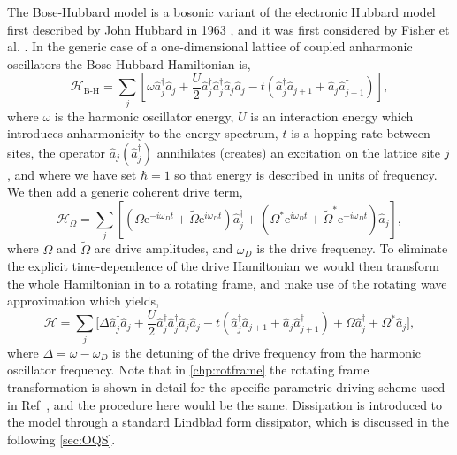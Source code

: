The Bose-Hubbard model is a bosonic variant of the electronic Hubbard model first described by John Hubbard in 1963 \cite{Hubbard1963}, and it was first considered by Fisher et al. \cite{Fisher1989}. In the generic case of a one-dimensional lattice of coupled anharmonic oscillators the Bose-Hubbard Hamiltonian is,
\begin{equation}
	\mathcal{H}_{\text{B-H}} = \sum_{j} \left[ \omega\hat{a}_{j}^{\dagger}\hat{a}_{j} + \frac{U}{2}\hat{a}_{j}^{\dagger}\hat{a}_{j}^{\dagger}\hat{a}_{j}\hat{a}_{j} - t\left(\hat{a}_{j}^{\dagger}\hat{a}_{j+1} + \hat{a}_{j}\hat{a}_{j+1}^{\dagger}\right) \right],
	\label{eq:mbq2-1}
\end{equation}
where \(\omega\) is the harmonic oscillator energy, \(U\) is an interaction energy which introduces anharmonicity to the energy spectrum, \(t\) is a hopping rate between sites, the operator \(\hat{a}_{j} (\hat{a}_{j}^{\dagger})\) annihilates (creates) an excitation on the lattice site \(j\), and where we have set \(\hbar = 1\) so that energy is described in units of frequency. We then add a generic coherent drive term,
\begin{equation}
	\mathcal{H}_{\Omega} = \sum_{j} \left[ \left(\Omega\mathrm{e}^{-i\omega_{D}t} + \tilde{\Omega}\mathrm{e}^{i\omega_{D}t}\right) \hat{a}_{j}^{\dagger} + \left(\Omega^{*}\mathrm{e}^{i\omega_{D}t} + \tilde{\Omega}^{*}\mathrm{e}^{-i\omega_{D}t}\right)\hat{a}_{j}\right],
	\label{eq:mbq2-2}
\end{equation}
where \(\Omega\) and \(\tilde{\Omega}\) are drive amplitudes, and \(\omega_{D}\) is the drive frequency. To eliminate the explicit time-dependence of the drive Hamiltonian we would then transform the whole Hamiltonian in to a rotating frame, and make use of the rotating wave approximation which yields,
\begin{equation}
	\mathcal{H} = \sum_{j} \biggl[\Delta\hat{a}_{j}^{\dagger}\hat{a}_{j} + \frac{U}{2}\hat{a}_{j}^{\dagger}\hat{a}_{j}^{\dagger}\hat{a}_{j}\hat{a}_{j} - t\left(\hat{a}_{j}^{\dagger}\hat{a}_{j+1} + \hat{a}_{j}\hat{a}_{j+1}^{\dagger}\right) + \Omega\hat{a}_{j}^{\dagger} + \Omega^{*}\hat{a}_{j} \biggr],
	\label{eq:mbq2-3}
\end{equation}
where \(\Delta = \omega - \omega_{D}\) is the detuning of the drive frequency from the harmonic oscillator frequency. Note that in \cref{chp:rotframe} the rotating frame transformation is shown in detail for the specific parametric driving scheme used in Ref~\cite{Brown2018}, and the procedure here would be the same. Dissipation is introduced to the model through a standard Lindblad form dissipator, which is discussed in the following \cref{sec:OQS}.

